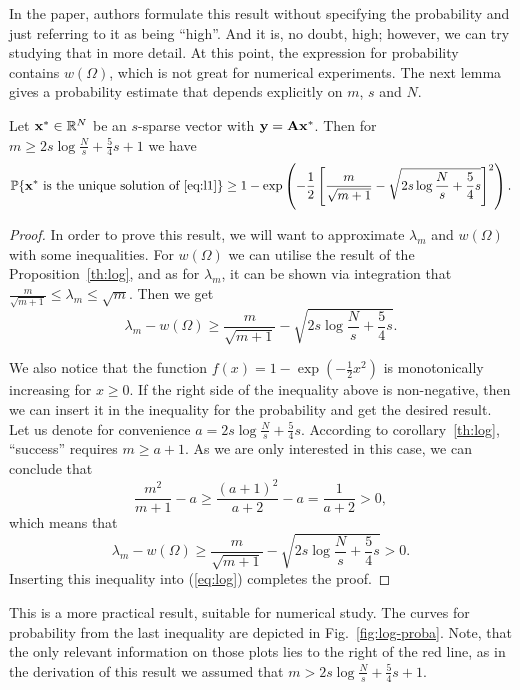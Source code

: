 \begin{remark}
    In the paper, authors formulate this result without specifying the probability and just referring to it as being ``high''.
    And it is, no doubt, high; however, we can try studying that in more detail.
    At this point, the expression for probability contains $w(\Omega)$, which is not great for numerical experiments.
    The next lemma gives a probability estimate that depends explicitly on $m$, $s$ and $N$.
\end{remark}

\begin{lemma} \label{th:log_improved}
    Let $\mathbf{x}^* \in \mathbb{R}^N$ be an $s$-sparse vector with $\mathbf{y} = \mathbf{A} \mathbf{x}^*$.
    Then for $m \geq 2s\log \frac{N}{s} + \frac{5}{4}s + 1$ we have
    \[
    \mathbb{P}\{\mathbf{x}^* \text{ is the unique solution of \ref{eq:l1}}\} \geq 1 - \exp \left( - \frac{1}{2} \left[\frac{m}{\sqrt{m+1}} - \sqrt {2s \log \frac{N}{s}+\frac{5}{4}s}\right]^2 \right).
    \]
\end{lemma}
\begin{proof}
    In order to prove this result, we will want to approximate $\lambda_m$ and $w(\Omega)$ with some inequalities.
    For $w(\Omega)$ we can utilise the result of the Proposition~\ref{th:log}, and as for $\lambda_m$, it can be shown via integration
    that $\frac{m}{\sqrt{m+1}} \leq \lambda_m \leq \sqrt{m}$.
    Then we get
    \[\lambda_m - w(\Omega) \geq \frac{m}{\sqrt{m+1}} - \sqrt{2s \log \frac{N}{s} + \frac{5}{4}s}.\]

    We also notice that the function $f(x) = 1 - \exp\left(-\frac{1}{2}x^2\right)$ is monotonically increasing for $x \geq 0$.
    If the right side of the inequality above is non-negative, then we can insert it in the inequality for the probability
    and get the desired result.
    Let us denote for convenience $a = 2s \log \frac{N}{s} + \frac{5}{4}s$.
    According to corollary~\ref{th:log}, ``success'' requires $m \geq a+1$.
    As we are only interested in this case, we can conclude that
    \[ \frac{m^2}{m+1} - a \geq \frac{(a+1)^2}{a+2} - a = \frac{1}{a+2} > 0,\]
    which means that
    \[\lambda_m - w(\Omega) \geq \frac{m}{\sqrt{m+1}} - \sqrt{2s \log \frac{N}{s} + \frac{5}{4}s} > 0.\]
    Inserting this inequality into (\ref{eq:log}) completes the proof.
\end{proof}

This is a more practical result, suitable for numerical study.
    The curves for probability from the last inequality are depicted in Fig.~\ref{fig:log-proba}.
    Note, that the only relevant information on those plots lies to the right of the red line, as in the derivation of this
    result we assumed that $m > 2s \log \frac{N}{s} + \frac{5}{4}s + 1$.

